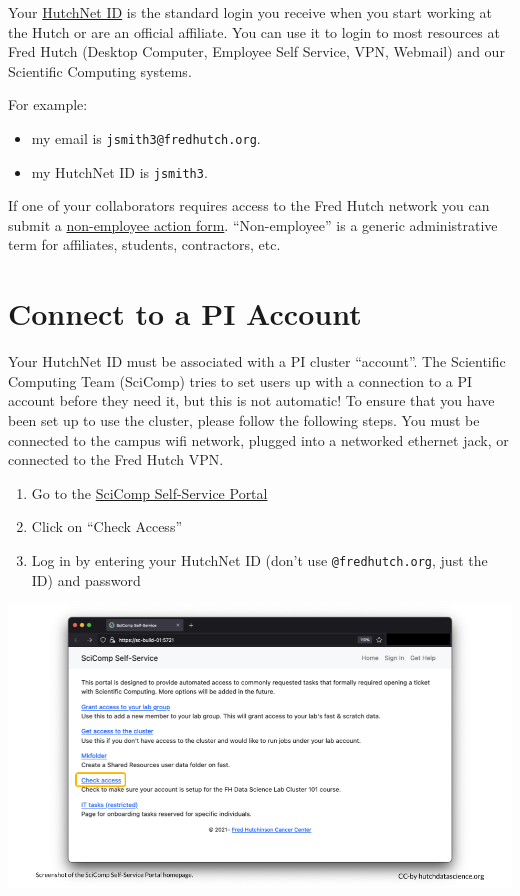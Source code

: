 \documentclass[
]{book}
\providecommand{\tightlist}{%
  \setlength{\itemsep}{0pt}\setlength{\parskip}{0pt}}
\begin{document}
Your \href{https://centernet.fredhutch.org/cn/u/center-it/help-desk.html}{HutchNet ID} is the standard login you receive when you start working at the Hutch or are an official affiliate. You can use it to login to most resources at Fred Hutch (Desktop Computer, Employee Self Service, VPN, Webmail) and our Scientific Computing systems.

For example:

\begin{itemize}
\tightlist
\item
  my email is \texttt{jsmith3@fredhutch.org}.\\
\item
  my HutchNet ID is \texttt{jsmith3}.
\end{itemize}

If one of your collaborators requires access to the Fred Hutch network you can submit a \href{https://centernet.fredhutch.org/cn/f/hr/lcex/non-employee-action-form.html}{non-employee action form}. ``Non-employee'' is a generic administrative term for affiliates, students, contractors, etc.

\hypertarget{pi-account}{%
\section{Connect to a PI Account}\label{pi-account}}

Your HutchNet ID must be associated with a PI cluster ``account''. The Scientific Computing Team (SciComp) tries to set users up with a connection to a PI account before they need it, but this is not automatic! To ensure that you have been set up to use the cluster, please follow the following steps. You must be connected to the campus wifi network, plugged into a networked ethernet jack, or connected to the Fred Hutch VPN.

\begin{enumerate}
\def\labelenumi{\arabic{enumi}.}
\tightlist
\item
  Go to the \href{https://scicomp-self-service.fredhutch.org/}{SciComp Self-Service Portal}
\item
  Click on ``Check Access''
\item
  Log in by entering your HutchNet ID (don't use \texttt{@fredhutch.org}, just the ID) and password
\end{enumerate}

\includegraphics[width=1\linewidth]{resources/images/02-accounts_files/figure-latex//1BQxrVYdKZTbpCaF-i_q9w7s9x034lEXpQZDU-Sl09cs_g166d4f31b2e_0_0}
\end{document}
